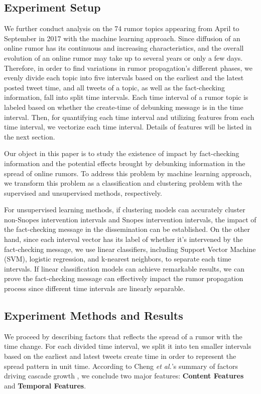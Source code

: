 \documentclass[conference]{IEEEtran}
\begin{document}
	\subsection{Experiment Setup}
	We further conduct analysis on the 74 rumor topics appearing from April to September in 2017 with the machine learning approach. Since diffusion of an online rumor has its continuous and increasing characteristics, and the overall evolution of an online rumor may take up to several years or only a few days. Therefore, in order to find variations in rumor propagation's different phases, we evenly divide each topic into five intervals based on the earliest and the latest posted tweet time, and all tweets of a topic, as well as the fact-checking information, fall into split time intervals. Each time interval of a rumor topic is labeled based on whether the create-time of debunking message is in the time interval. Then, for quantifying each time interval and utilizing features from each time interval, we vectorize each time interval. Details of features will be listed in the next section.
	
	Our object in this paper is to study the existence of impact by fact-checking information and the potential effects brought by debunking information in the spread of online rumors. To address this problem by machine learning approach, we transform this problem as a classification and clustering problem with the supervised and unsupervised methods, respectively. 
	
	For unsupervised learning methods, if clustering models can accurately cluster non-Snopes intervention intervals and Snopes intervention intervals, the impact of the fact-checking message in the dissemination can be established. On the other hand, since each interval vector has its label of whether it's intervened by the fact-checking message, we use linear classifiers, including Support Vector Machine (SVM), logistic regression, and k-nearest neighbors, to separate each time intervals. If linear classification models can achieve remarkable results, we can prove the fact-checking message can effectively impact the rumor propagation process since different time intervals are linearly separable.
	
	\subsection{Experiment Methods and Results}
	We proceed by describing factors that reflects the spread of a rumor with the time change. For each divided time interval, we split it into ten smaller intervals based on the earliest and latest tweets create time in order to represent the spread pattern in unit time. According to Cheng \textit{et al.}'s summary of factors driving cascade growth \cite{cheng2014can}, we conclude two major features: \textbf{Content Features} and \textbf{Temporal Features}.
	
\end{document}
